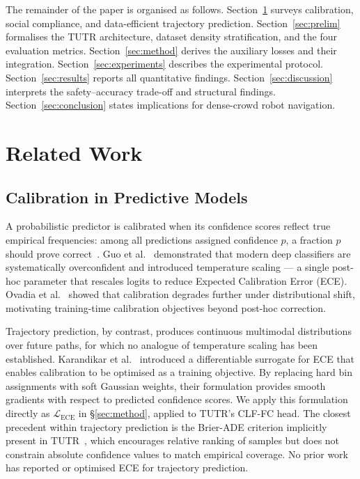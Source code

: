 \documentclass{article}
\begin{document}
The remainder of the paper is organised as follows. Section~\ref{sec:related}
surveys calibration, social compliance, and data-efficient trajectory
prediction. Section~\ref{sec:prelim} formalises the TUTR architecture,
dataset density stratification, and the four evaluation metrics.
Section~\ref{sec:method} derives the auxiliary losses and their integration.
Section~\ref{sec:experiments} describes the experimental protocol.
Section~\ref{sec:results} reports all quantitative findings.
Section~\ref{sec:discussion} interprets the safety--accuracy trade-off and
structural findings. Section~\ref{sec:conclusion} states implications for
dense-crowd robot navigation.


\section{Related Work}
\label{sec:related}

\subsection{Calibration in Predictive Models}

A probabilistic predictor is calibrated when its confidence scores reflect
true empirical frequencies: among all predictions assigned confidence \(p\),
a fraction \(p\) should prove correct~\cite{guo2017calibration,niculescu2005predicting}.
Guo et al.~\cite{guo2017calibration} demonstrated that modern deep classifiers
are systematically overconfident and introduced temperature scaling --- a
single post-hoc parameter that rescales logits to reduce Expected Calibration
Error (ECE). Ovadia et al.~\cite{ovadia2019can} showed that calibration
degrades further under distributional shift, motivating training-time
calibration objectives beyond post-hoc correction.

Trajectory prediction, by contrast, produces continuous multimodal
distributions over future paths, for which no analogue of temperature scaling
has been established. Karandikar et al.~\cite{karandikar2021soft} introduced
a differentiable surrogate for ECE that enables calibration to be optimised as
a training objective. By replacing hard bin assignments with soft Gaussian
weights, their formulation provides smooth gradients with respect to predicted
confidence scores. We apply this formulation directly as
\(\mathcal{L}_{\text{ECE}}\) in \S\ref{sec:method}, applied to TUTR's
CLF-FC head. The closest precedent within trajectory prediction is the
Brier-ADE criterion implicitly present in TUTR~\cite{shi2023tutr}, which
encourages relative ranking of samples but does not constrain absolute
confidence values to match empirical coverage. No prior work has reported
or optimised ECE for trajectory prediction.
\end{document}

